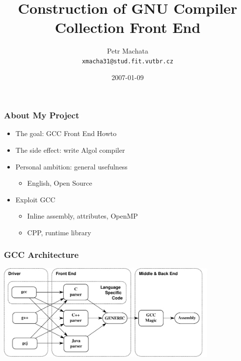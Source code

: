 \documentclass[14pt]{beamer}
\title[Construction of GNU Compiler Collection Front End]{Construction of GNU Compiler Collection Front End}
\author[Petr Machata]{Petr Machata \\ \texttt{xmacha31@stud.fit.vutbr.cz}}
\date{2007-01-09}
\def\Algol{{\sc Algol}\space}
\begin{document}
\frame{\titlepage}

\frame
{
  \frametitle{About My Project}

  \begin{itemize}
  \item The goal: GCC Front End Howto
  \item The side effect: write \Algol 60 compiler
  \item Personal ambition: general usefulness
    \begin{itemize}
    \item English, Open Source
    \end{itemize}
  \item Exploit GCC
    \begin{itemize}
    \item Inline assembly, attributes, OpenMP
    \item CPP, runtime library
    \end{itemize}
  \end{itemize}
}

\frame
{
  \frametitle{GCC Architecture}

  \includegraphics[height=4.8cm]{demo-gccarch.pdf}
}
\end{document}
